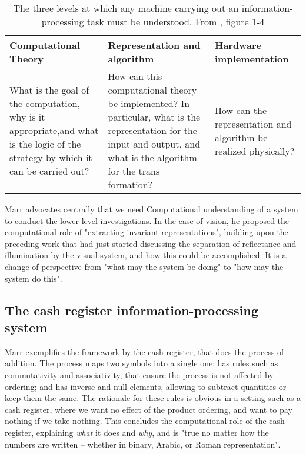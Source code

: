     \begin{table}[]
        \centering
        \begin{tabular}{p{4cm}p{4cm}p{4cm}}
        \hline \vspace{.2cm}
            Computational Theory & Representation and algorithm & Hardware implementation\\\hline
            
            What is the goal of the computation, why is it appropriate,and what is the logic of the strategy by which it can be carried out? & 
            
            How can this computational theory be implemented? In particular, what is the representation for the input and output, and what is the algorithm for the trans formation? &
            
            How can the representation and algorithm be realized physically?
            \\\hline
        \end{tabular}
        \caption{The three levels at which any machine carrying out an information-processing task must be understood. From \cite{marr1982vision}, figure 1-4}
        \label{tab:three_levels}
    \end{table}
    
    Marr advocates centrally that we need Computational understanding of a system to conduct the lower level investigations. In the case of vision, he proposed the computational role of "extracting invariant representations", building upon the preceding work that had just started discussing the separation of reflectance and illumination by the visual system, and how this could be accomplished. It is a change of perspective from "what may the system be doing" to "how may the system do this".
    
    \subsection{The cash register information-processing system}
    
        Marr exemplifies the framework by the cash register, that does the process of addition. The process maps two symbols into a single one; has rules such as commutativity and associativity, that ensure the process is not affected by ordering; and has inverse and null elements, allowing to subtract quantities or keep them the same. The rationale for these rules is obvious in a setting such as a cash register, where we want no effect of the product ordering, and want to pay nothing if we take nothing. This concludes the computational role of the cash register, explaining \textit{what} it does and \textit{why}, and is "true no matter how the numbers are written -- whether in binary, Arabic, or Roman representation".
        
